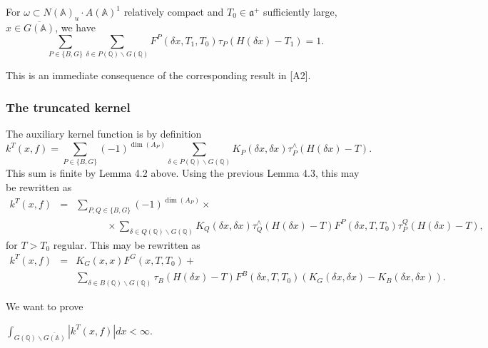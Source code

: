 \begin{lemma}
For $\omega \subset N({\mathbb{A}})_u\cdot A({\mathbb{A}})^1$ relatively
compact and
$T_0\in {\mathfrak{a}}^{+}$ sufficiently large,
$x\in \overline{G({\mathbb{A}})}$, we
have 
\[
\sum_{P\in \{B,G\}}
\sum_{\delta \in P({\mathbb{Q}})\backslash G({\mathbb{Q}})}
F^P(\delta x,T_1,T_0)\tau _P(H(\delta x)-T_1)=1.
\]
\end{lemma}

This is an immediate consequence of the corresponding result in [A2].

\subsubsection{The truncated kernel}

The auxiliary kernel function is by definition 
\[
k^T(x,f)=\sum_{P\in \{B,G\}}(-1)^{\dim (A_P)}
\sum_{\delta \in P({\mathbb{Q}})\backslash G({\mathbb{Q}})}
K_P(\delta x,\delta x)\tau _P^{\wedge }(H(\delta x)-T). 
\]
This sum is finite by Lemma 4.2 above. Using the previous Lemma 4.3,
this may be rewritten as 
\begin{eqnarray*}
k^T(x,f) &=&\sum_{P,Q\in \{B,G\}}(-1)^{\dim (A_P)}\times \\
&&\;\;\;\;\;\;\;\;\;\;\;\times
\sum_{\delta \in Q({\mathbb{Q}})\backslash G({\mathbb{Q}})}
K_Q(\delta x,\delta x)\tau _Q^{\wedge }(H(\delta x)-T)
F^P(\delta x,T,T_0)\tau _P^Q(H(\delta x)-T),
\end{eqnarray*}
for $T>T_0$ regular. This may be rewritten as
\begin{eqnarray}
k^T(x,f) &=&K_G(x,x)F^G(x,T,T_0)+ \\
&&\sum_{\delta \in B({\mathbb{Q}})\backslash G({\mathbb{Q}})}
\tau _B(H(\delta x)-T)
F^B(\delta x,T,T_0)(K_G(\delta x,\delta x)-K_B(\delta x,\delta x)). 
\nonumber
\end{eqnarray}

We want to prove

\begin{lemma}
$\int_{G({\mathbb{Q}})\backslash \overline{G({\mathbb{A}})}}|k^T(x,f)|dx<\infty .$
\end{lemma}

